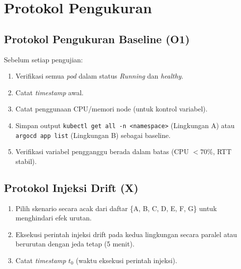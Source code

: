 \section{Protokol Pengukuran}

\subsection{Protokol Pengukuran Baseline (O1)}
Sebelum setiap pengujian:
\begin{enumerate}
  \item Verifikasi semua \textit{pod} dalam status \textit{Running} dan \textit{healthy}.
  \item Catat \textit{timestamp} awal.
  \item Catat penggunaan CPU/memori node (untuk kontrol variabel).
  \item Simpan output \texttt{kubectl get all -n <namespace>} (Lingkungan A) atau \texttt{argocd app list} (Lingkungan B) sebagai baseline.
  \item Verifikasi variabel pengganggu berada dalam batas (CPU $< 70\%$, RTT stabil).
\end{enumerate}

\subsection{Protokol Injeksi Drift (X)}
\begin{enumerate}
  \item Pilih skenario secara acak dari daftar \{A, B, C, D, E, F, G\} untuk menghindari efek urutan.
  \item Eksekusi perintah injeksi drift pada kedua lingkungan secara paralel atau berurutan dengan jeda tetap (5 menit).
  \item Catat \textit{timestamp} $t_0$ (waktu eksekusi perintah injeksi).
\end{enumerate}


